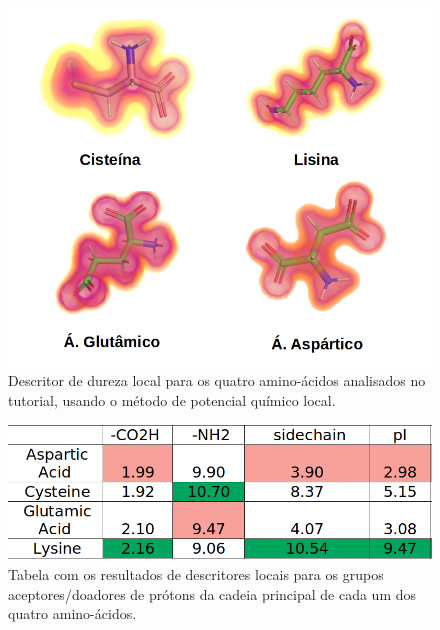 \documentclass[a4paper,11pt]{refart}
\begin{document}
\hspace*{-\leftmarginwidth}
\begin{minipage}{\fullwidth}
	\begin{figure}[H]
		\begin{center}
			\includegraphics[width=5in]{images/tut4_img16}
			\caption{Descritor de dureza local para os quatro amino-ácidos analisados no tutorial, usando o método de potencial químico local.}
			\label{fig_tut4_14}
		\end{center}
	\end{figure}
\end{minipage}

\hspace*{-\leftmarginwidth}
\begin{minipage}{\fullwidth}
	\begin{figure}[H]
		\begin{center}
			\includegraphics[width=5in]{images/tut4_img17}
			\caption{Tabela com os resultados de descritores locais para os grupos aceptores/doadores de prótons da cadeia principal de cada um dos quatro amino-ácidos.}
			\label{fig_tut4_15}
		\end{center}
	\end{figure}
\end{minipage}
\end{document}
